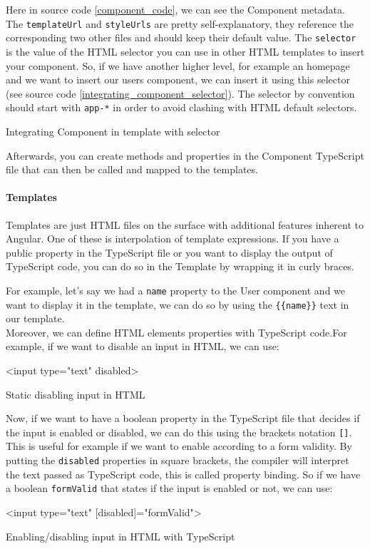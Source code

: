 \documentclass[twoside, openright,11pt,a4paper]{book}
\newenvironment{code}{\captionsetup{type=listing}}{}
\begin{document}
Here in source code \ref{component_code}, we can see the Component metadata. The \verb+templateUrl+ and \verb+styleUrls+ are pretty self-explanatory, they reference the corresponding two other files and should keep their default value. The \verb+selector+ is the value of the HTML selector you can use in other HTML templates to insert your component. So, if we have another higher level, for example an homepage and we want to insert our users component, we can insert it using this selector (see source code \ref{integrating_component_selector}). The selector by convention should start with \verb+app-*+ in order to avoid clashing with HTML default selectors.
\begin{code}
	\caption{Integrating Component in template with selector}
	\label{integrating_component_selector}
\end{code}

Afterwards, you can create methods and properties in the Component TypeScript file that can then be called and mapped to the templates. 
\paragraph{Templates}
Templates\cite{angular:doc:templates} are just HTML files on the surface with additional features inherent to Angular. One of these is interpolation of template expressions. If you have a public property in the TypeScript file or you want to display the output of TypeScript code, you can do so in the Template by wrapping it in curly braces.

For example, let's say we had a \verb+name+ property to the User component and we want to display it in the template, we can do so by using the \verb+{{name}}+ text in our template.\\

Moreover, we can define HTML elements properties with TypeScript code.For example, if we want to disable an input in HTML, we can use:
\begin{code}
\begin{inlinehtml}
<input type="text" disabled>
\end{inlinehtml}
\caption{Static disabling input in HTML}	
\end{code}
Now, if we want to have a boolean property in the TypeScript file that decides if the input is enabled or disabled, we can do this using the brackets notation \verb+[]+. This is useful for example if we want to enable according to a form validity. By putting the \verb+disabled+ properties in square brackets, the compiler will interpret the text passed as TypeScript code, this is called property binding. So if we have a boolean \verb+formValid+ that states if the input is enabled or not, we can use:
\begin{code}
\begin{inlinehtml}
<input type="text" [disabled]="formValid">
\end{inlinehtml}
\caption{Enabling/disabling input in HTML with TypeScript}	
\end{code}
\end{document}
